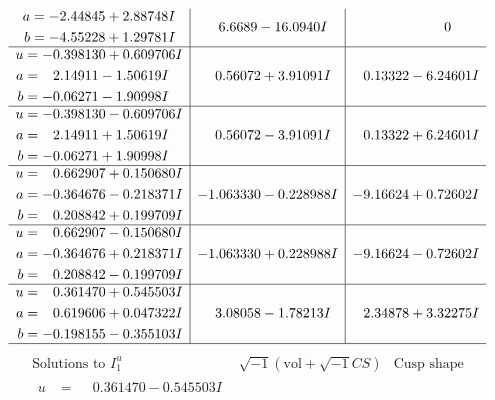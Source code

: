 \documentclass[1p]{elsarticle_modified}
\theoremstyle{definition}
\newcommand{\I}{\sqrt{-1}}
\begin{document}
$$\begin{array}{c|c|c}
\begin{aligned}
a &= -2.44845 + 2.88748 I \\
b &= -4.55228 + 1.29781 I\end{aligned}
 & \phantom{-}6.6689 - 16.0940 I & \phantom{-0.000000 } 0 \\ \hline\begin{aligned}
u &= -0.398130 + 0.609706 I \\
a &= \phantom{-}2.14911 - 1.50619 I \\
b &= -0.06271 - 1.90998 I\end{aligned}
 & \phantom{-}0.56072 + 3.91091 I & \phantom{-}0.13322 - 6.24601 I \\ \hline\begin{aligned}
u &= -0.398130 - 0.609706 I \\
a &= \phantom{-}2.14911 + 1.50619 I \\
b &= -0.06271 + 1.90998 I\end{aligned}
 & \phantom{-}0.56072 - 3.91091 I & \phantom{-}0.13322 + 6.24601 I \\ \hline\begin{aligned}
u &= \phantom{-}0.662907 + 0.150680 I \\
a &= -0.364676 - 0.218371 I \\
b &= \phantom{-}0.208842 + 0.199709 I\end{aligned}
 & -1.063330 - 0.228988 I & -9.16624 + 0.72602 I \\ \hline\begin{aligned}
u &= \phantom{-}0.662907 - 0.150680 I \\
a &= -0.364676 + 0.218371 I \\
b &= \phantom{-}0.208842 - 0.199709 I\end{aligned}
 & -1.063330 + 0.228988 I & -9.16624 - 0.72602 I \\ \hline\begin{aligned}
u &= \phantom{-}0.361470 + 0.545503 I \\
a &= \phantom{-}0.619606 + 0.047322 I \\
b &= -0.198155 - 0.355103 I\end{aligned}
 & \phantom{-}3.08058 - 1.78213 I & \phantom{-}2.34878 + 3.32275 I\\
 \hline 
 \end{array}$$\newpage$$\begin{array}{c|c|c}  
\text{Solutions to }I^u_{1}& \I (\text{vol} + \sqrt{-1}CS) & \text{Cusp shape}\\
 \hline 
\begin{aligned}
u &= \phantom{-}0.361470 - 0.545503 I \\

\end{aligned}
\end{array}$$
\end{document}
